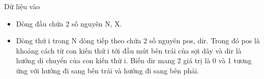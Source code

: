 Dữ liệu vào
\begin{itemize}
	\item Dòng đầu chứa 2 số nguyên N, X.
	\item Dòng thứ i trong N dòng tiếp theo chứa 2 số nguyên pos, dir. Trong đó pos là khoảng cách từ con kiến thứ i tới đầu mút bên trái của sợi dây và dir là hướng di chuyển của con kiến thứ i. Biến dir mang 2 giá trị là 0 và 1 tương ứng với hướng đi sang bên trái và hướng đi sang bên phải.
\end{itemize}